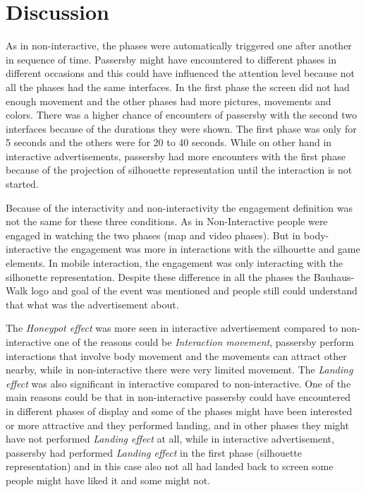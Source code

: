 \section{Discussion}

As in non-interactive, the phases were automatically triggered one after another in sequence of time. Passersby might have encountered to different phases in different occasions and this could have influenced the attention level because not all the phases had the same interfaces. In the first phase the screen did not had enough movement and the other phases had more pictures, movements and colors. There was a higher chance of encounters of passersby with the second two interfaces because of the durations they were shown. The first phase was only for 5 seconds and the others were for 20 to 40 seconds. While on other hand in interactive advertisements, passersby had more encounters with the first phase because of the projection of silhouette representation until the interaction is not started. 

Because of the interactivity and non-interactivity the engagement definition was not the same for these three conditions. As in Non-Interactive people were engaged in watching the two phases (map and video phases). But in body-interactive the engagement was more in interactions with the silhouette and game elements. In mobile interaction, the engagement was only interacting with the silhouette representation. Despite these difference in all the phases the Bauhaus-Walk logo and goal of the event was mentioned and people still could understand that what was the advertisement about.

The \emph{Honeypot effect} was more seen in interactive advertisement compared to non-interactive one of the reasons could be \emph{Interaction movement}, passersby perform interactions that involve body movement and the movements can attract other nearby, while in non-interactive there were very limited movement. The \emph{Landing effect} was also significant in interactive compared to non-interactive. One of the main reasons could be that in non-interactive passersby could have encountered in different phases of display and some of the phases might have been interested or more attractive and they performed landing, and in other phases they might have not performed \emph{Landing effect} at all, while in interactive advertisement, passersby had performed \emph{Landing effect} in the first phase (silhouette representation) and in this case also not all had landed back to screen some people might have liked it and some might not.

